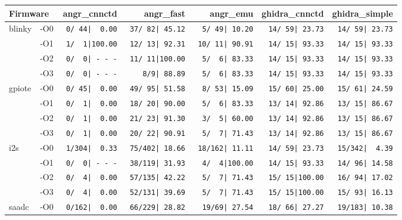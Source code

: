 \begin{tabular}{@{}llrrrrr@{}}
\toprule
\multicolumn{2}{l}{\textbf{Firmware}} & angr\_cnnctd & angr\_fast & angr\_emu & ghidra\_cnnctd & ghidra\_simple \\ \midrule
\multirow{4}{*}{blinky}
    & -O0 & \texttt{  0/~44|~~0.00} & \texttt{ 37/~82|~45.12} & \texttt{  5/~49|~10.20} & \texttt{ 14/~59|~23.73} & \texttt{ 14/~59|~23.73} \\
    & -O1 & \texttt{  1/~~1|100.00} & \texttt{ 12/~13|~92.31} & \texttt{ 10/~11|~90.91} & \texttt{ 14/~15|~93.33} & \texttt{ 14/~15|~93.33} \\
    & -O2 & \texttt{  0/~~0|~-~-~-} & \texttt{ 11/~11|100.00} & \texttt{  5/~~6|~83.33} & \texttt{ 14/~15|~93.33} & \texttt{ 14/~15|~93.33} \\
    & -O3 & \texttt{  0/~~0|~-~-~-} & \texttt{    8/9|~88.89} & \texttt{  5/~~6|~83.33} & \texttt{ 14/~15|~93.33} & \texttt{ 14/~15|~93.33} \\ \midrule
\multirow{4}{*}{gpiote}
    & -O0 & \texttt{  0/~45|~~0.00} & \texttt{ 49/~95|~51.58} & \texttt{  8/~53|~15.09} & \texttt{ 15/~60|~25.00} & \texttt{ 15/~61|~24.59} \\
    & -O1 & \texttt{  0/~~1|~~0.00} & \texttt{ 18/~20|~90.00} & \texttt{  5/~~6|~83.33} & \texttt{ 13/~14|~92.86} & \texttt{ 13/~15|~86.67} \\
    & -O2 & \texttt{  0/~~1|~~0.00} & \texttt{ 21/~23|~91.30} & \texttt{  3/~~5|~60.00} & \texttt{ 13/~14|~92.86} & \texttt{ 13/~15|~86.67} \\
    & -O3 & \texttt{  0/~~1|~~0.00} & \texttt{ 20/~22|~90.91} & \texttt{  5/~~7|~71.43} & \texttt{ 13/~14|~92.86} & \texttt{ 13/~15|~86.67} \\ \midrule
\multirow{4}{*}{i2s}
    & -O0 & \texttt{  1/304|~~0.33} & \texttt{ 75/402|~18.66} & \texttt{ 18/162|~11.11} & \texttt{ 14/~59|~23.73} & \texttt{ 15/342|~~4.39} \\
    & -O1 & \texttt{  0/~~0|~-~-~-} & \texttt{ 38/119|~31.93} & \texttt{  4/~~4|100.00} & \texttt{ 14/~15|~93.33} & \texttt{ 14/~96|~14.58} \\
    & -O2 & \texttt{  0/~~4|~~0.00} & \texttt{ 57/135|~42.22} & \texttt{  5/~~7|~71.43} & \texttt{ 15/~15|100.00} & \texttt{ 16/~94|~17.02} \\
    & -O3 & \texttt{  0/~~4|~~0.00} & \texttt{ 52/131|~39.69} & \texttt{  5/~~7|~71.43} & \texttt{ 15/~15|100.00} & \texttt{ 15/~93|~16.13} \\ \midrule
\multirow{4}{*}{saadc}
    & -O0 & \texttt{  0/162|~~0.00} & \texttt{ 66/229|~28.82} & \texttt{  19/69|~27.54} & \texttt{ 18/~66|~27.27} & \texttt{ 19/183|~10.38} \\

\end{tabular}
